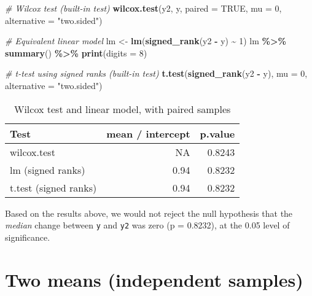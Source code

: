 \documentclass[
  12pt,
]{krantz}
\newenvironment{Shaded}{\begin{snugshade}}{\end{snugshade}}
\newcommand{\CommentTok}[1]{\textcolor[rgb]{0.56,0.35,0.01}{\textit{#1}}}
\newcommand{\DataTypeTok}[1]{\textcolor[rgb]{0.13,0.29,0.53}{#1}}
\newcommand{\DecValTok}[1]{\textcolor[rgb]{0.00,0.00,0.81}{#1}}
\newcommand{\KeywordTok}[1]{\textcolor[rgb]{0.13,0.29,0.53}{\textbf{#1}}}
\newcommand{\NormalTok}[1]{#1}
\newcommand{\OperatorTok}[1]{\textcolor[rgb]{0.81,0.36,0.00}{\textbf{#1}}}
\newcommand{\OtherTok}[1]{\textcolor[rgb]{0.56,0.35,0.01}{#1}}
\newcommand{\StringTok}[1]{\textcolor[rgb]{0.31,0.60,0.02}{#1}}
\begin{document}
\begin{Shaded}
\begin{Highlighting}[]
\CommentTok{\#  Wilcox test (built{-}in test)}
\KeywordTok{wilcox.test}\NormalTok{(y2, y, }\DataTypeTok{paired =} \OtherTok{TRUE}\NormalTok{, }\DataTypeTok{mu =} \DecValTok{0}\NormalTok{, }\DataTypeTok{alternative =} \StringTok{"two.sided"}\NormalTok{)}

\CommentTok{\# Equivalent linear model}
\NormalTok{lm \textless{}{-}}\StringTok{ }\KeywordTok{lm}\NormalTok{(}\KeywordTok{signed\_rank}\NormalTok{(y2 }\OperatorTok{{-}}\StringTok{ }\NormalTok{y) }\OperatorTok{\textasciitilde{}}\StringTok{ }\DecValTok{1}\NormalTok{)}
\NormalTok{  lm }\OperatorTok{\%\textgreater{}\%}\StringTok{ }\KeywordTok{summary}\NormalTok{() }\OperatorTok{\%\textgreater{}\%}\StringTok{ }\KeywordTok{print}\NormalTok{(}\DataTypeTok{digits =} \DecValTok{8}\NormalTok{)}

\CommentTok{\# t{-}test using signed ranks (built{-}in test)}
\KeywordTok{t.test}\NormalTok{(}\KeywordTok{signed\_rank}\NormalTok{(y2 }\OperatorTok{{-}}\StringTok{ }\NormalTok{y), }\DataTypeTok{mu =} \DecValTok{0}\NormalTok{, }\DataTypeTok{alternative =} \StringTok{"two.sided"}\NormalTok{)}
\end{Highlighting}
\end{Shaded}

\begin{table}

\caption{\label{tab:unnamed-chunk-27}Wilcox test and linear model, with paired samples}
\centering
\begin{tabular}[t]{lrr}
\toprule
Test & mean / intercept & p.value\\
\midrule
wilcox.test & NA & 0.8243\\
lm (signed ranks) & 0.94 & 0.8232\\
t.test (signed ranks) & 0.94 & 0.8232\\
\bottomrule
\end{tabular}
\end{table}

Based on the results above, we would not reject the null hypothesis that the \emph{median} change between \texttt{y} and \texttt{y2} was zero (p = 0.8232), at the 0.05 level of significance.

\hypertarget{two-means-independent-samples}{%
\chapter{Two means (independent samples)}\label{two-means-independent-samples}}
\end{document}
